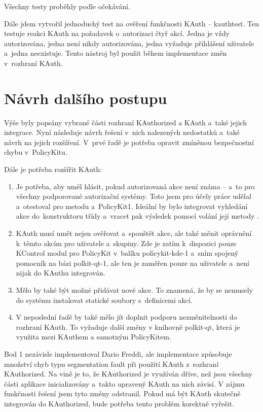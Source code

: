 Všechny testy proběhly podle očekávání.

Dále jdem vytvořil jednoduchý test na ověření funkčnosti KAuth -- kauthtest. Ten testuje reakci KAuth na požadavek o~autorizaci čtyř akcí. Jedna je vždy autorizována, jedna není nikdy autorizována, jedna vyžaduje přihlášení uživatele a~jedna neexistuje. Tento nástroj byl použit během implementace změn v~rozhraní KAuth.

\section{Návrh dalšího postupu}
Výše byly popsány vybrané části rozhraní KAuthorized a KAuth a~také jejich integrace. Nyní následuje návrh řešení v~nich nalezených nedostatků a~také návrh na jejich rozšíření. V~prvé řadě je potřeba opravit zmíněnou bezpečnostní chybu v~PolicyKitu. 

Dále je potřeba rozšířit KAuth:
\begin{enumerate}
\item Je potřeba, aby uměl hlásit, pokud autorizovaná akce není známa -- a~to pro všechny podporované autorizační systémy. Toto jsem pro účely práce udělal a~otestoval pro metodu  a~PolicyKit1. Ideální by bylo integrovat vyhledání akce do~konstruktoru třídy  a~vracet pak výsledek pomocí volání její metody .
\item KAuth musí umět nejen ověřovat a~spouštět akce, ale také měnit oprávnění k~těmto akcím pro uživatele a~skupiny. Zde je zatím k~dispozici pouze KControl modul pro PolicyKit v~balíku policykit-kde-1 a~sním spojený pomocník na bázi polkit-qt-1, ale ten je zaměřen pouze na uživatele a~není nijak do KAuthu integrován.
\item Mělo by také být možné přidávat nové akce. To znamená, že by se nemusely do systému instalovat statické soubory s~definicemi akcí.
\item V neposlední řadě by také mělo jít doplnit podporu nezměnitelnosti do rozhraní KAuth. To vyžaduje další změny v knihovně polkit-qt, která je využita mezi KAuthem a samotným PolicyKitem.
\end{enumerate}

Bod 1 nezávisle implementoval Dario Freddi, ale implementace způsobuje množství chyb typu segmentation fault při použití KAuth z~rozhraní KAuthorized. Na vině je to, že KAuthorized je využíván dříve, než jsou všechny části aplikace inicializovány a~takto upravený KAuth na nich závisí. V zájmu funkčnosti řešení jsem tyto změny odstranil. Pokud má být KAuth skutečně integrován do KAuthorized, bude potřeba tento problém korektně vyřešit.

